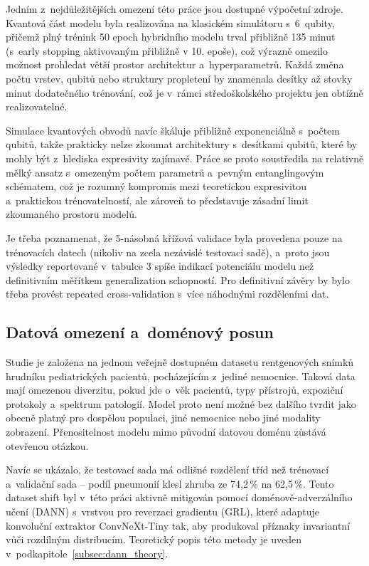 \documentclass[12pt, a4paper]{report}
\begin{document}
Jedním z~nejdůležitějších omezení této práce jsou dostupné výpočetní zdroje. Kvantová část modelu byla realizována na klasickém simulátoru s~6~qubity, přičemž plný trénink 50 epoch hybridního modelu trval přibližně 135 minut (s~early stopping aktivovaným přibližně v 10. epoše), což výrazně omezilo možnost prohledat větší prostor architektur a~hyperparametrů. Každá změna počtu vrstev, qubitů nebo struktury propletení by znamenala desítky až stovky minut dodatečného trénování, což je v~rámci středoškolského projektu jen obtížně realizovatelné.

Simulace kvantových obvodů navíc škáluje přibližně exponenciálně s~počtem qubitů, takže prakticky nelze zkoumat architektury s~desítkami qubitů, které by mohly být z~hlediska expresivity zajímavé. Práce se proto soustředila na relativně mělký ansatz s~omezeným počtem parametrů a~pevným entanglingovým schématem, což je rozumný kompromis mezi teoretickou expresivitou a~praktickou trénovatelností, ale zároveň to představuje zásadní limit zkoumaného prostoru modelů.

Je třeba poznamenat, že 5-násobná křížová validace byla provedena pouze na trénovacích datech (nikoliv na zcela nezávislé testovací sadě), a~proto jsou výsledky reportované v~tabulce 3 spíše indikací potenciálu modelu než definitivním měřítkem generalization schopností. Pro definitivní závěry by bylo třeba provést repeated cross-validation s~více náhodnými rozděleními dat.

\subsection{Datová omezení a~doménový posun}

Studie je založena na jednom veřejně dostupném datasetu rentgenových snímků hrudníku pediatrických pacientů, pocházejícím z~jediné nemocnice. Taková data mají omezenou diverzitu, pokud jde o~věk pacientů, typy přístrojů, expoziční protokoly a~spektrum patologií. Model proto není možné bez dalšího tvrdit jako obecně platný pro dospělou populaci, jiné nemocnice nebo jiné modality zobrazení. Přenositelnost modelu mimo původní datovou doménu zůstává otevřenou otázkou.

Navíc se ukázalo, že testovací sada má odlišné rozdělení tříd než trénovací a~validační sada – podíl pneumonií klesl zhruba ze 74{,}2\,\% na 62{,}5\,\%. Tento dataset shift byl v~této práci aktivně mitigován pomocí doménově-adverzálního učení (DANN) s~vrstvou pro reverzaci gradientu (GRL), které adaptuje konvoluční extraktor ConvNeXt-Tiny tak, aby produkoval příznaky invariantní vůči rozdílným distribucím. Teoretický popis této metody je uveden v~podkapitole~\ref{subsec:dann_theory}.
\end{document}
